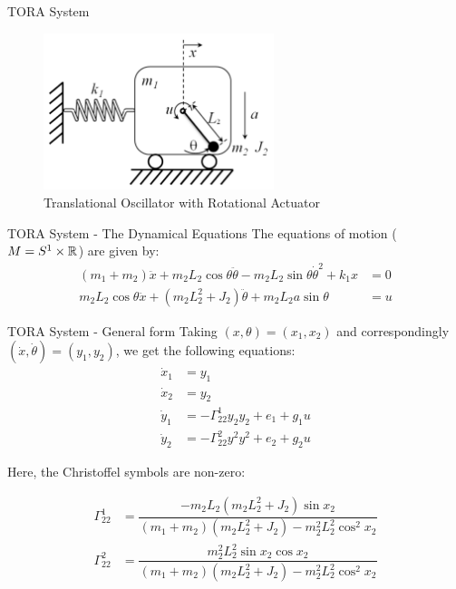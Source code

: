 \documentclass{beamer}
\begin{document}
\begin{frame}{TORA System}

  \begin{figure}
    \centering
    \includegraphics[width=0.6\textwidth]{../Figures/tora.png}
    \caption{Translational Oscillator with Rotational Actuator}
  \end{figure}
  
\end{frame}

\begin{frame}{TORA System - The Dynamical Equations}
  The equations of motion ($M = S^1 \times \mathbb{R}^{}$) are given by:
  \begin{equation}
    \begin{split}
        (m_1 + m_2) \ddot{x} + m_2 L_2 \cos{\theta} \ddot{\theta} - m_2 L_2 \sin{\theta} \dot{\theta}^2 +k_1 x & = 0 \\
        m_2 L_2 \cos{\theta} \ddot{x} + (m_2 L_2^2 + J_2) \ddot{\theta} + m_2L_2 a \sin{\theta} &= u
    \end{split}
  \end{equation}
  
\end{frame}

\begin{frame}{TORA System - General form}
  Taking $(x, \theta) = (x_1, x_2)$ and correspondingly $(\dot{x}, \dot{\theta}) = (y_1, y_2)$, we get the following equations:
  \begin{equation}
  \begin{split}
      \dot{x}_1  & = y_1 \\
      \dot{x}_2  & = y_2 \\
      \dot{y}_1  & = -\Gamma_{22}^1 y_2 y_2 +  e_1 + g_1 u \\
      \dot{y}_2  & = -\Gamma_{22}^2 y^2 y^2 + e_2 + g_2 u
  \end{split}
  \end{equation}

  Here, the Christoffel symbols are non-zero: \vspace{-10pt}

  \begin{equation*}
    \begin{split}
      \Gamma_{22}^1 &= \dfrac{-m_2L_2(m_2L_2^2 + J_2) \sin{x_2}}{(m_1+m_2)(m_2L_2^2 +J_2) - m_2^2L_2^2 \cos^2{x_2}} \\
      \Gamma_{22}^2 &= \dfrac{m_2^2L_2^2 \sin{x_2} \cos{x_2}}{(m_1+m_2)(m_2L_2^2 +J_2) - m_2^2L_2^2 \cos^2{x_2}}
    \end{split}
  \end{equation*}
\end{frame}
\end{document}
